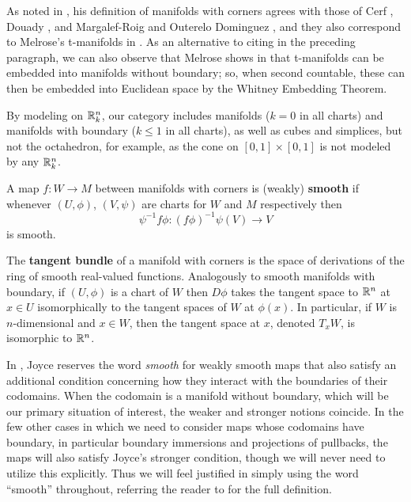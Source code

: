 As noted in \cite[Remark 2.11]{Joy12}, his definition of manifolds with corners agrees with those of Cerf \cite{Ce61}, Douady \cite{Doua61}, and Margalef-Roig and Outerelo Dominguez \cite{MaDo92}, and they also correspond to Melrose's t-manifolds in \cite{Melrose}. 
As an alternative to citing \cite{MaDo92} in the preceding paragraph, we can also observe that Melrose shows in \cite[Proposition 1.14.1]{Melrose} that t-manifolds can be embedded into manifolds without boundary; so, when second countable, these can then be embedded into Euclidean space by the Whitney Embedding Theorem.



By modeling on $\mathbb{R}^n_k$, our category includes manifolds ($k = 0$ in all charts) and manifolds with boundary ($k \leq 1$ in all charts), as well as cubes and simplices, but not the octahedron, for example, as the cone on $[0,1] \times [0,1]$ is not modeled by any $\mathbb{R}^n_k$.

\begin{comment}
	The smooth real-valued functions on a manifold with corners $W$ are those $f$ such that for each chart $\phi \colon U \subset \R^n_k \to W$ the composition $f \circ \phi \colon U \to \R$ is smooth.
\end{comment}

\begin{definition}
	A map $f \colon W \to M$ between manifolds with corners is {(weakly) \bf smooth} if whenever $(U,\phi)$, $(V,\psi)$ are charts for $W$ and $M$ respectively then
	$$\psi^{-1}f \phi \colon (f\phi)^{-1}\psi(V) \to V$$
	is smooth.

	The \textbf{tangent bundle} of a manifold with corners is the space of derivations of the ring of smooth real-valued functions.
	Analogously to smooth manifolds with boundary, if $(U,\phi)$ is a chart of $W$ then $D\phi$ takes the tangent space to $\mathbb{R}^n$ at $x \in U$ isomorphically to the tangent spaces of $W$ at $\phi(x)$.
	In particular, if $W$ is $n$-dimensional and $x \in W$, then the tangent space at $x$, denoted $T_xW$, is isomorphic to $\mathbb{R}^n$.
\end{definition}

\begin{remark}\label{R: weakly smooth}
	In \cite{Joy12}, Joyce reserves the word \textit{smooth} for weakly smooth maps that also satisfy an additional condition concerning how they interact with the boundaries of their codomains.
	When the codomain is a manifold without boundary, which will be our primary situation of interest, the weaker and stronger notions coincide.
	In the few other cases in which we need to consider maps whose codomains have boundary, in particular boundary immersions and projections of pullbacks, the maps will also satisfy Joyce's stronger condition, though we will never need to utilize this explicitly.
	Thus we will feel justified in simply using the word ``smooth'' throughout, referring the reader to \cite[Definition 3.1]{Joy12} for the full definition.
\end{remark}

